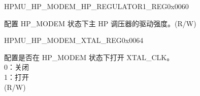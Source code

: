 \begin{register}{H}{PMU\_HP\_MODEM\_HP\_REGULATOR1\_REG}{0x0060}\label{regdesc:PMUHPMODEMHPREGULATOR1REG}
%
%
\regnewline%
\begin{regdesc}\begin{reglist}
\label{fielddesc:PMUHPMODEMHPREGULATORDRVB}\item [PMU\_HP\_MODEM\_HP\_REGULATOR\_DRV\_B] 配置 HP\_MODEM 状态下主 HP 调压器的驱动强度。(R/W)
\end{reglist}\end{regdesc}
\end{register}


\begin{register}{H}{PMU\_HP\_MODEM\_XTAL\_REG}{0x0064}\label{regdesc:PMUHPMODEMXTALREG}
%
%
\regnewline%
\begin{regdesc}\begin{reglist}
\label{fielddesc:PMUHPMODEMXPDXTAL}\item [PMU\_HP\_MODEM\_XPD\_XTAL] 配置是否在 HP\_MODEM 状态下打开 XTAL\_CLK。\\
0：关闭\\
1：打开\\
(R/W)
\end{reglist}\end{regdesc}
\end{register}


